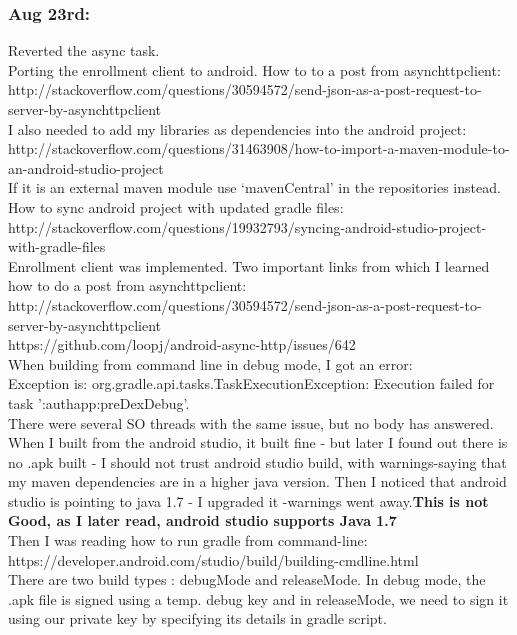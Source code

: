 \documentclass[11pt]{article}
\begin{document}
\subsubsection*{Aug 23rd:}
Reverted the async task.\\
Porting the enrollment client to android. How to to a post from asynchttpclient: 
http://stackoverflow.com/questions/30594572/send-json-as-a-post-request-to-server-by-asynchttpclient\\
I also needed to add my libraries as dependencies into the android project: 
http://stackoverflow.com/questions/31463908/how-to-import-a-maven-module-to-an-android-studio-project\\
If it is an external maven module use `mavenCentral' in the repositories instead.\\
How to sync android project with updated gradle files: http://stackoverflow.com/questions/19932793/syncing-android-studio-project-with-gradle-files\\

Enrollment client was implemented. Two important links from which I learned how to do a post from asynchttpclient:\\
http://stackoverflow.com/questions/30594572/send-json-as-a-post-request-to-server-by-asynchttpclient\\
https://github.com/loopj/android-async-http/issues/642\\

When building from command line in debug mode, I got an error: \\
Exception is: org.gradle.api.tasks.TaskExecutionException: Execution failed for task ':authapp:preDexDebug'.\\
There were several SO threads with the same issue, but no body has answered.\\
When I built from the android studio, it built fine - but later I found out there is no .apk built - I should not trust android studio build, with 
warnings-saying that my maven dependencies are in a higher java version. 
Then I noticed that android studio is pointing to java 1.7 - I upgraded it -warnings went away.\textbf{This is not Good, as I later read, android 
studio supports Java 1.7}\\

Then I was reading how to run gradle from command-line: https://developer.android.com/studio/build/building-cmdline.html\\
There are two build types : debugMode and releaseMode. In debug mode, the .apk file is signed using a temp. debug key and in releaseMode, we need to 
sign it using our private key by specifying its details in gradle script.\\
\end{document}
